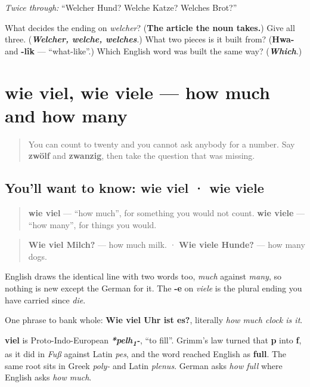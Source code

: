 \emph{Twice through:} \textquotedblleft{}Welcher Hund? Welche Katze? Welches Brot?\textquotedblright{}

\begin{tcolorbox}[breakable,colback=teal!4,colframe=teal!35!black,title={Before you move on}]
What decides the ending on \emph{welcher}? (\textbf{The article the noun takes.}) Give all three. (\emph{\textbf{Welcher, welche, welches}}.) What two pieces is it built from? (\textbf{Hwa-} and \textbf{-lîk} — \textquotedblleft{}what-like\textquotedblright{}.) Which English word was built the same way? (\emph{\textbf{Which}}.)
\end{tcolorbox}
\section[wie viel · wie viele]{wie viel, wie viele — how much and how many}

\label{lesson:GE-C34-wie-viel}



\begin{quote}
You can count to twenty and you cannot ask anybody for a number. Say \textbf{zwölf} and \textbf{zwanzig}, then take the question that was missing.
\end{quote}

\subsection*{You'll want to know: wie viel · wie viele}
\begin{quote}
\textbf{wie viel} — \textquotedblleft{}how much\textquotedblright{}, for something you would not count. \textbf{wie viele} — \textquotedblleft{}how many\textquotedblright{}, for things you would.
\end{quote}

\begin{quote}
\textbf{Wie viel Milch?} — how much milk. · \textbf{Wie viele Hunde?} — how many dogs.
\end{quote}

English draws the identical line with two words too, \emph{much} against \emph{many}, so nothing is new except the German for it. The \textbf{-e} on \emph{viele} is the plural ending you have carried since \emph{die}.

One phrase to bank whole: \textbf{Wie viel Uhr ist es?}, literally \emph{how much clock is it}.

\begin{cousinweb}
\textbf{viel} is Proto-Indo-European \emph{\textbf{*pelh\textsubscript{1}-}}, \textquotedblleft{}to fill\textquotedblright{}. Grimm's law turned that \textbf{p} into \textbf{f}, as it did in \emph{Fuß} against Latin \emph{pes}, and the word reached English as \textbf{full}. The same root sits in Greek \emph{poly-} and Latin \emph{plenus}. German asks \emph{how full} where English asks \emph{how much}.
\end{cousinweb}


